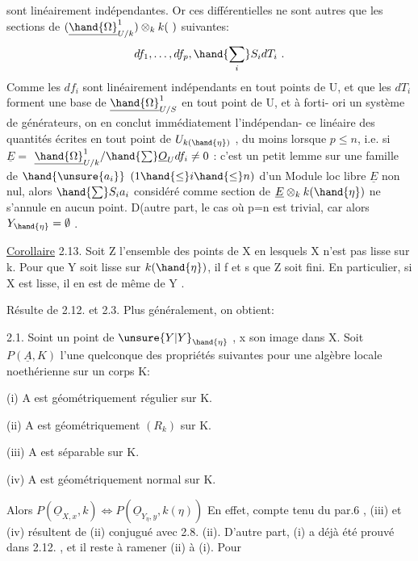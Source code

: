 
sont linéairement indépendantes. Or ces différentielles ne sont autres
que les sections de $(\underline{\hand{\Omega}}^1_{U/k})\otimes_k k(\ )$ suivantes:
\[ df_1, \ldots, df_p , \hand{\sum_i} S_i dT_i \ . \]
Comme les $df_i$ sont linéairement indépendants en tout points de U, et
que les $dT_i$ forment une base de $\underline{\hand{\Omega}}^1_{U/S}$ en tout point de U,  et à forti-%
ori un système de générateurs, on en conclut immédiatement l'indépendan-%
ce linéaire des quantités écrites en tout point de $U_{k(\hand{\eta})}$ , du moins
lorsque $p\leq n$, i.e. si $\underline{E} =$ $\underline{\hand{\Omega}}^1_{U/k} / \hand{\sum} \underline{O}_U df_i \neq 0$ : c'est un petit
lemme sur une famille de  $\hand{\unsure{a_i}}$ $(1 \hand{\leq} i \hand{\leq} n)$ d'un Module loc libre $\underline{E}$ non
nul, alors $\hand{\sum} S_i a_i$ considéré comme section de $\underline{E}\otimes_k k(\hand{\eta})$ ne s'annule
en aucun point. D(autre part, le cas où p=n est trivial, car alors
$Y_{\hand{\eta}} = \emptyset$ .

\uline{Corollaire} 2.13. Soit Z l'ensemble des points de X en lesquels X
n'est pas lisse sur k. Pour que Y soit lisse sur $k(\hand{\eta})$, il f et s
que Z soit fini. En particulier, si X est lisse, il en est de même de
Y .

Résulte de 2.12. et 2.3. Plus généralement, on obtient:

\uline{} 2.1. Soint  un point de $\unsure{Y|Y}_{\hand{\eta}}$ , x son image dans X. Soit
$P(\underline{A},K)$  l'une quelconque des propriétés suivantes pour une algèbre
locale noethérienne sur un corps K:

(i) A est géométriquement régulier sur K.

(ii) A est géométriquement $(R_k)$ sur K.

(iii) A est séparable sur K.

(iv) A est géométriquement normal sur K.

Alors $P(\underline{O}_{X,x}, k) \Longleftrightarrow P(\underline{O}_{Y_\eta,y}, k(\eta))$
 En effet, compte tenu du par.6 , (iii) et (iv)
résultent de (ii) conjugué avec 2.8. (ii). D'autre part, (i)
a déjà été prouvé dans 2.12. , et il reste à ramener (ii) à (i). Pour

